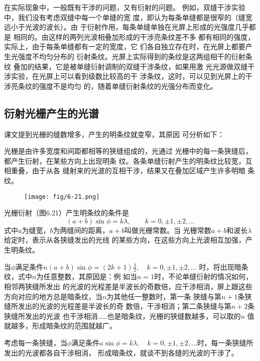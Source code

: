 在实际现象中，一般既有干涉的问题，又有衍射的问题。
例如，双缝干涉实验中，我们没有考虑双缝中每一个单缝的宽
度，即认为每条单缝都是很窄的（缝宽远小于光波的波长）。由
于衍射作用，每条单缝单独在光屏上形成的光强度几乎都是
相同的。由这样的两列光波相叠加形成的干涉亮条纹差不多
都有相同的强度，实际上，由于每条单缝都有一定的宽度，它
们各自独立存在时，在光屏上都要产生光强度不均匀分布的
衍射条纹。光屏上实际得到的条纹是这两组相干的衍射条纹
叠加的结果，它是被单缝衍射调制的双缝干涉条纹，如果用激
光光源做双缝干涉实验，在光屏上可以看到级数比较高的干
涉条纹，这时，可以见到光屏上的干涉亮条纹的强度不是均匀
的，随着单缝衍射条纹的光强分布而变化。

\subsection{衍射光栅产生的光谱}
课文提到光栅的缝数增多，产生的明条纹就变窄，其原因
可分析如下：

光栅是由许多宽度和间距都相等的狭缝组成的，光通过
光栅中的每一条狭缝后，都产生衍射，在某些方向上出现明条
纹。各条单缝衍射产生的明条纹比较宽，互相重叠，由于从各
缝射来的光波的互相干涉，结果又在叠加区域产生许多明暗
条纹。

\begin{figure}[htp]
    \centering
     \texttt{[image: fig/6-21.png]}
    \caption{}
\end{figure}

光栅衍射（图6.21）产生明条纹的条件是
\begin{equation}
    (a+b)\sin\phi=k\lambda,\qquad k=0,\pm1,\pm2,\ldots
\end{equation}
式中$a$为缝宽，$b$为两缝间的距离，$a+b$叫做光栅常数。当
光栅常数$a+b$和波长$\lambda$给定时，表示从各狭缝发出的光线
的某些方向，在这些方向上光波相互加强，产生明条纹。

当$\phi$满足条件$n(a+b)\sin\phi=(2k+1)\frac{\lambda}{2},\quad 
k=0,\pm1,\pm 2,\ldots$ 时，将出现暗条纹，式中$n$为任意整数，其原因是：例
如当$n=1$时，不论单缝衍射的情况如何，相邻两狭缝所发出
的光波的光程差是半波长的奇数倍，应干涉相消，屏上跟这些
方向对应的地方总是暗条纹，当$n$为其他任一整数时，第一条
狭缝与第$n+1$条狭缝所发出的光波的光程差是半波长的奇
数倍，干涉相消；第二条狭缝与第$n+2$条狭缝所发出的光波
也干涉相消……也是暗条纹，光栅的狭缝数越多，可以取的$n$
值就越多，形成暗条纹的范围就越广。

考虑每一条狭缝，当$\phi$满足条件$a\sin\phi=k\lambda,\quad k=0,
\pm1,\pm2,\ldots$时，每一条狭缝所发出的光波都各自干涉相消，
形成暗条纹，就谈不到各缝的光波的干涉了。

